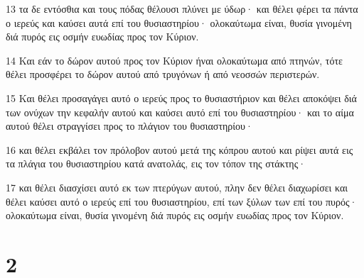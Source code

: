 \par 13 τα δε εντόσθια και τους πόδας θέλουσι πλύνει με ύδωρ· και θέλει φέρει τα πάντα ο ιερεύς και καύσει αυτά επί του θυσιαστηρίου· ολοκαύτωμα είναι, θυσία γινομένη διά πυρός εις οσμήν ευωδίας προς τον Κύριον.
\par 14 Και εάν το δώρον αυτού προς τον Κύριον ήναι ολοκαύτωμα από πτηνών, τότε θέλει προσφέρει το δώρον αυτού από τρυγόνων ή από νεοσσών περιστερών.
\par 15 Και θέλει προσαγάγει αυτό ο ιερεύς προς το θυσιαστήριον και θέλει αποκόψει διά των ονύχων την κεφαλήν αυτού και καύσει αυτό επί του θυσιαστηρίου· και το αίμα αυτού θέλει στραγγίσει προς το πλάγιον του θυσιαστηρίου·
\par 16 και θέλει εκβάλει τον πρόλοβον αυτού μετά της κόπρου αυτού και ρίψει αυτά εις τα πλάγια του θυσιαστηρίου κατά ανατολάς, εις τον τόπον της στάκτης·
\par 17 και θέλει διασχίσει αυτό εκ των πτερύγων αυτού, πλην δεν θέλει διαχωρίσει και θέλει καύσει αυτό ο ιερεύς επί του θυσιαστηρίου, επί των ξύλων των επί του πυρός· ολοκαύτωμα είναι, θυσία γινομένη διά πυρός εις οσμήν ευωδίας προς τον Κύριον.

\chapter{2}

